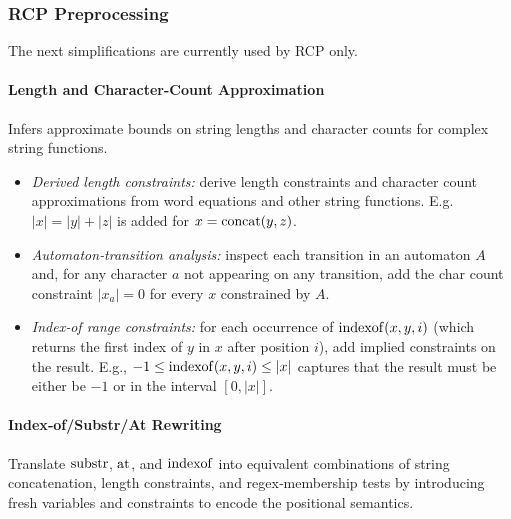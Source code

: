 
\subsubsection{RCP Preprocessing}

The next simplifications are currently used by RCP only.

\paragraph{Length and Character-Count Approximation}
Infers approximate bounds on string lengths and character counts for complex string functions.
\begin{itemize}
    \item \emph{Derived length constraints:} derive length constraints and character count approximations from word equations and other string functions.
    E.g.\ $|x| = |y| + |z|$ is added for $x = \operatorname{concat}(y, z)$.
    \item \emph{Automaton‐transition analysis:} inspect each transition in an automaton $A$ and, for any character $a$ not appearing on any transition, add the char count constraint $|x_a| = 0$
    for every $x$ constrained by $A$.
    \item \emph{Index‐of range constraints:} for each occurrence of $\operatorname{indexof}(x,y,i)$ (which returns the first index of $y$ in $x$ after position $i$), add implied constraints on the result.
    E.g.,
    $-1 \leq \operatorname{indexof}(x, y, i) \leq \lvert x\rvert$
    captures that the result must be either be $-1$ or in the interval $[0,\lvert x\rvert]$.
\end{itemize}

\paragraph{Index‐of/Substr/At Rewriting}
Translate $\operatorname{substr}$, $\operatorname{at}$, and $\operatorname{indexof}$ into equivalent combinations of string concatenation, length constraints, and regex‐membership tests by introducing fresh variables and constraints to encode the positional semantics.

